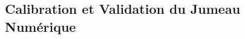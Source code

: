 % 
% 
% 
% 
% 
% 
% 

\subsection{Calibration et Validation du Jumeau Numérique}
\label{sec:validation_jumeau_numerique}

